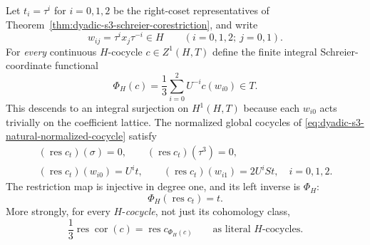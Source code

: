 \begin{theorem}
\label{thm:dyadic-s3-explicit-cocycle-projector}
Let
$t_i=\tau^i$ for $i=0,1,2$
be the right-coset representatives
of Theorem~\ref{thm:dyadic-s3-schreier-corestriction},
and write
\[
w_{ij}=\tau^i x_j\tau^{-i}\in H
\qquad(i=0,1,2;\ j=0,1).
\]
For \emph{every} continuous
$H$-cocycle $c\in Z^1(H,T)$
define the finite integral
Schreier-coordinate functional
\begin{equation}\label{eq:dyadic-s3-strict-phi-functional}
\boxed{\quad
\Phi_H(c)=\frac13
\sum_{i=0}^{2}U^{-i}c(w_{i0})\in T.
\quad}
\end{equation}
This descends to an
integral surjection on
$H^1(H,T)$ because each
$w_{i0}$ acts trivially
on the coefficient lattice.
The normalized global cocycles
of \eqref{eq:dyadic-s3-natural-normalized-cocycle}
satisfy
\begin{equation}\label{eq:dyadic-s3-strict-res-values}
\boxed{\quad
\begin{gathered}
(\operatorname{res}c_t)(\sigma)=0,\qquad
(\operatorname{res}c_t)(\tau^3)=0,\\
(\operatorname{res}c_t)(w_{i0})=U^i t,
\qquad
(\operatorname{res}c_t)(w_{i1})=2U^iS t,
\quad i=0,1,2.
\end{gathered}\quad}
\end{equation}
The restriction map is
injective in degree one,
and its left inverse is
$\Phi_H$:
\begin{equation}\label{eq:dyadic-s3-strict-res-phi}
\Phi_H(\operatorname{res}c_t)=t.
\end{equation}
More strongly, for every
$H$-\emph{cocycle}, not just
its cohomology class,
\begin{equation}\label{eq:dyadic-s3-strict-e-cocycle}
\boxed{\quad
\frac13\operatorname{res}
\operatorname{cor}(c)
=\operatorname{res}c_{\Phi_H(c)}
\qquad\text{as literal }H
\text{-cocycles}.\quad}
\end{equation}


\end{theorem}
